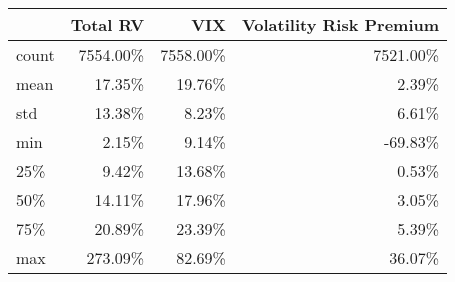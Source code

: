\begin{tabular}{lrrr}
\toprule
{} &  Total RV &      VIX &  Volatility Risk Premium \\
\midrule
count &  7554.00\% & 7558.00\% &                 7521.00\% \\
mean  &    17.35\% &   19.76\% &                    2.39\% \\
std   &    13.38\% &    8.23\% &                    6.61\% \\
min   &     2.15\% &    9.14\% &                  -69.83\% \\
25\%   &     9.42\% &   13.68\% &                    0.53\% \\
50\%   &    14.11\% &   17.96\% &                    3.05\% \\
75\%   &    20.89\% &   23.39\% &                    5.39\% \\
max   &   273.09\% &   82.69\% &                   36.07\% \\
\bottomrule
\end{tabular}
